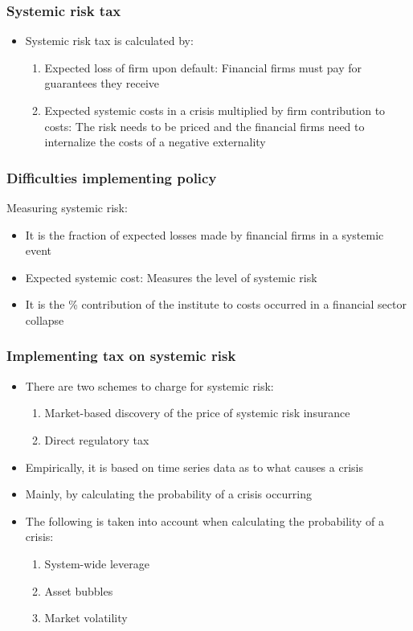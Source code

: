\documentclass[11pt]{beamer}
\begin{document}

\begin{frame}
\frametitle{Systemic risk tax}
\begin{itemize}\itemsep10pt
\item Systemic risk tax is calculated by:
\begin{enumerate}\itemsep5pt
\item Expected loss of firm upon default: Financial firms must pay for guarantees they receive
\item Expected systemic costs in a crisis multiplied by firm contribution to costs: The risk needs to be priced and the financial firms need to internalize the costs of a negative externality
\end{enumerate}
\end{itemize}
\end{frame}


\begin{frame}
\frametitle{Difficulties implementing policy}
Measuring systemic risk:
\begin{itemize}\itemsep10pt
\item It is the fraction of expected losses made by financial firms in a systemic event
\item Expected systemic cost: Measures the level of systemic risk
\item It is the \% contribution of the institute to costs occurred in a financial sector collapse
\end{itemize}
\end{frame}


\begin{frame}
\frametitle{Implementing tax on systemic risk}
\begin{itemize}\itemsep10pt
\item There are two schemes to charge for systemic risk:
\begin{enumerate}\itemsep5pt
\item Market-based discovery of the price of systemic risk insurance
\item Direct regulatory tax
\end{enumerate}
\item Empirically, it is based on time series data as to what causes a crisis
\item Mainly, by calculating the probability of a crisis occurring
\item The following is taken into account when calculating the probability of a crisis:
\begin{enumerate}\itemsep5pt
\item System-wide leverage
\item Asset bubbles
\item Market volatility
\end{enumerate}

\end{itemize}
\end{frame}
\end{document}
